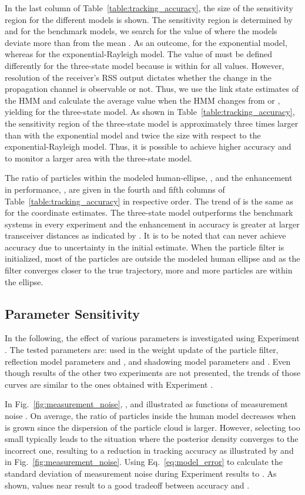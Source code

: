 \documentclass[journal, 10pt, twocolumn, balance]{IEEEtran}
\begin{document}
In the last column of Table~\ref{table:tracking_accuracy}, the size of the sensitivity region for the different models is shown. The sensitivity region is determined by  and for the benchmark models, we search for the value of  where the models deviate more than  from the mean . As an outcome,  for the exponential model, whereas  for the exponential-Rayleigh model. The value of  must be defined differently for the three-state model because  is within  for all  values. However, resolution of the receiver's RSS output dictates whether the change in the propagation channel is observable or not. Thus, we use the link state estimates of the HMM and calculate the average  value when the HMM changes from  or , yielding  for the three-state model. As shown in Table~\ref{table:tracking_accuracy}, the sensitivity region of the three-state model is approximately three times larger than with the exponential model and twice the size with respect to the exponential-Rayleigh model. Thus, it is possible to achieve higher accuracy and to monitor a larger area with the three-state model.


The ratio of particles within the modeled human-ellipse, , and the enhancement in performance, , are given in the fourth and fifth columns of Table~\ref{table:tracking_accuracy} in respective order. The trend of  is the same as for the coordinate estimates. The three-state model outperforms the benchmark systems in every experiment and the enhancement in accuracy is greater at larger transceiver distances as indicated by . It is to be noted that  can never achieve  accuracy due to uncertainty in the initial estimate. When the particle filter is initialized, most of the particles are outside the modeled human ellipse and as the filter converges closer to the true trajectory, more and more particles are within the ellipse. 


\subsection{Parameter Sensitivity}\label{sec:parameter_sensitivity}

In the following, the effect of various parameters is investigated using Experiment . The tested parameters are:  used in the weight update of the particle filter, reflection model parameters  and , and shadowing model parameters  and . Even though results of the other two experiments are not presented, the trends of those curves are similar to the ones obtained with Experiment .

In Fig.~\ref{fig:measurement_noise}, ,  and  illustrated as functions of measurement noise . On average, the ratio of particles inside the human model  decreases when  is grown since the dispersion of the particle cloud is larger. However, selecting  too small typically leads to the situation where the posterior density converges to the incorrect one, resulting to a reduction in tracking accuracy as illustrated by  and  in Fig.~\ref{fig:measurement_noise}. Using Eq.~\eqref{eq:model_error} to calculate the standard deviation of measurement noise during Experiment  results to . As shown, values near  result to a good tradeoff between accuracy and .
\end{document}
